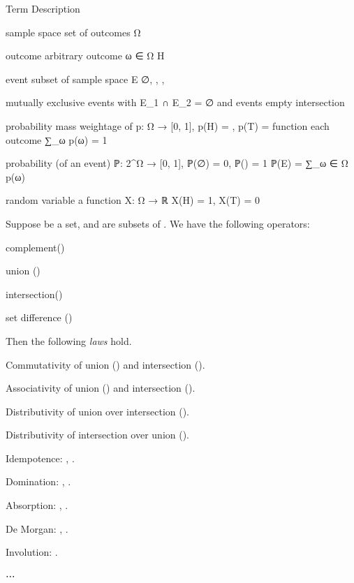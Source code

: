 \startchapter [title={Discrete Probability Spaces}]

	\setuptabulate [
		split=yes,
		header=text,
		frame=on,
		title={\tfa Notations}]

	\starttabulate [|l|l|M|m|]
		\FL  \FL
		\NC  Term  \NC  Description  \NC  {}  \NC  {}  \NR
		\ML  \ML

		\NC  sample space  \NC  set of outcomes  \NC  Ω  \NC  {}  \NR  \ML

		\NC  outcome  \NC  arbitrary outcome  \NC  ω ∈ Ω  \NC  H  \NR  \ML

		\NC  event  \NC  subset of sample space  \NC  E  \NC  ∅, , ,   \NR  \ML

		\NC  mutually exclusive  \NC  events with  \NC  E_1 ∩ E_2 = ∅  \NC  {} and   \NR
		\NC  events  \NC  empty intersection  \NC  \NC  \NR  \ML

		\NC  probability mass  \NC  weightage of  \NC  p: Ω → [0, 1],   \NC  p(H) = , p(T) =   \NR
		\NC  function  \NC   each outcome  \NC  ∑_ω p(ω) = 1  \NC  \NR  \ML

		\NC  probability  \NC  (of an event)  \NC  ℙ: 2^Ω → [0, 1],  \NC  ℙ(∅) = 0, ℙ() = 1  \NR
		\NC  \NC  \NC  ℙ(E) = ∑_{ω ∈ Ω} p(ω)  \NC  \NR  \ML

		\NC  random variable  \NC  a function  \NC  X: Ω → ℝ  \NC  X(H) = 1, X(T) = 0  \NR  \ML
		\BL
	\stoptabulate

\stopchapter


\startchapter [title={The algebra of sets}]
	
	Suppose  be a set, and  are subsets of . We have the following operators:
	\startitemize [1, joinedup]
		\item  complement()
		\item  union ()
		\item  intersection()
		\item  set difference ()
	\stopitemize

	Then the following \emph{laws} hold.
	\startitemize [1, joinedup]
		\item  Commutativity of union () and intersection ().
		\item  Associativity of union () and intersection ().
		\item  Distributivity of union over intersection ().
		\item  Distributivity of intersection over union ().
		\item  Idempotence: , .
		\item  Domination: , .
		\item  Absorption: , .
		\item  De Morgan: , .
		\item  Involution: .
		\item  ⋯
	\stopitemize
	
